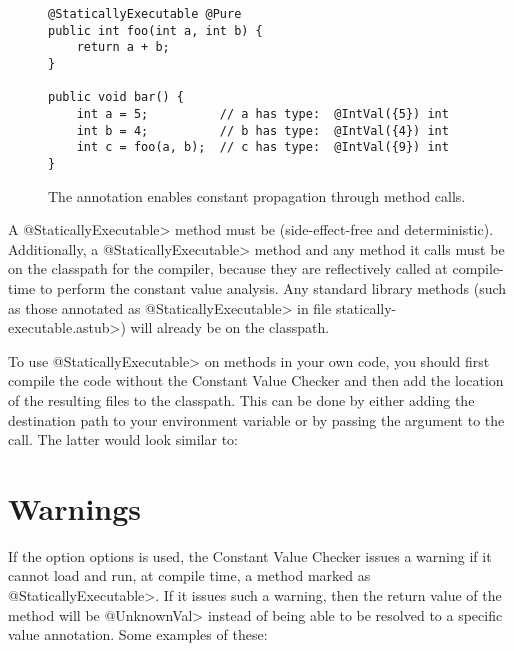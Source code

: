 \begin{figure}
\begin{Verbatim}
@StaticallyExecutable @Pure
public int foo(int a, int b) {
    return a + b;
}

public void bar() {
    int a = 5;          // a has type:  @IntVal({5}) int
    int b = 4;          // b has type:  @IntVal({4}) int
    int c = foo(a, b);  // c has type:  @IntVal({9}) int
}
\end{Verbatim}
\caption{The
   annotation enables
  constant propagation through method calls.}
\label{fig-staticallyexecutable}
\end{figure}

\begin{sloppypar}
A \<@StaticallyExecutable> method must
be  (side-effect-free and
deterministic).
Additionally, a \<@StaticallyExecutable> method and any method it calls must be on
the classpath for the compiler, because they are reflectively called at
compile-time to perform the constant value analysis. Any standard
library methods (such as those annotated as \<@StaticallyExecutable> in file
\<statically-executable.astub>) will already be on the
classpath.
\end{sloppypar}

\begin{sloppypar}
To use \<@StaticallyExecutable> on methods in your own code, you should
first compile the code without the Constant Value Checker and then add
the location of the resulting  files to the
classpath. This can be done by either adding the destination path to
your environment variable  or by passing the
argument  to the call. The latter
would look similar to:
\end{sloppypar}


\section{Warnings\label{value-checker-warnings}}

If the option  options is used, the Constant Value Checker issues a warning if it cannot load and run, at
compile time, a method marked as \<@StaticallyExecutable>.  If it issues
such a warning, then the return value of the method will be \<@UnknownVal>
instead of being able to be resolved to a specific value annotation.
Some examples of these:

